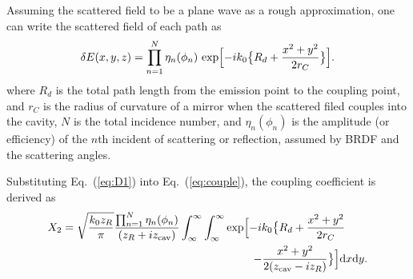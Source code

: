 Assuming the scattered field to be a plane wave as a rough approximation,
one can write the scattered field of each path as
\begin{eqnarray}
\label{eq:D1}
\begin{split}
\label{eq:D2}
\delta E(x,y,z) =\prod _{n=1}^{N} \eta_n (\phi _n)
\, \exp \Bigl[-i k_0 \bigl\{ R_d +\frac{x^2 +y^2}{2 r_C} \bigr\} \Bigr].
\end{split}
\end{eqnarray}
where $R_d$ is the total path length from the emission point
to the coupling point,
and $r_C$ is the radius of curvature of a mirror when the scattered filed
couples into the cavity, %
$N$ is the total incidence number,
and $\eta _n (\phi _{n})$ is the amplitude (or efficiency) of the $n$th
incident of scattering or reflection, assumed by BRDF and
the scattering angles.


Substituting Eq.~(\ref{eq:D1}) into Eq.~(\ref{eq:couple}),
the coupling coefficient is derived as
\begin{eqnarray}
\begin{split}
X_2= \sqrt{\frac{k_0 z_R}{\pi}} \frac{\prod _{n=1} ^N \eta _n (\phi _n)}{ (z_R +i z _{\rm cav})}
\int_{\infty}^{\infty} \int_{\infty}^{\infty}
\exp \Bigl[-i k_0\bigl\{ R_d+\frac{x^2+y^2}{2 r_C} \qquad \\
-\frac{x^2+y^2}{2(z _{\rm cav}-i z_R)}%
\bigr\} \Bigr] {\rm d}x {\rm d}y.
\end{split}
\end{eqnarray}





